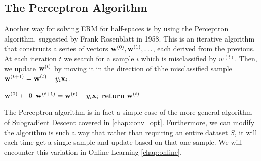 
\subsection{The Perceptron Algorithm}
Another way for solving ERM for half-spaces is by using the Perceptron algorithm, suggested by Frank Rosenblatt in 1958. This is an iterative algorithm that constructs a series of vectors $\mathbf{w}^{\left(0\right)},\mathbf{w}^{\left(1\right)},\ldots$, each derived from the previous. At each iteration $t$ we search for a sample $i$ which is misclassified by $w^{\left(t\right)}$. Then, we update $\mathbf{w}^{\left(t\right)}$ by moving it in the direction of thhe misclassified sample $\mathbf{w}^{\left(t+1\right)}=\mathbf{w}^{\left(t\right)} + y_i\mathbf{x}_i$. 
\begin{algorithm}
	\caption{Batch-Perceptron}\label{batch_perceptron}
	\begin{algorithmic}
		\State $\mathbf{w}^{\left(0\right)} \gets 0$ 
		\State $\mathbf{w}^{\left(t+1\right)}=\mathbf{w}^{\left(t\right)}+y_i\mathbf{x}_i$
		\Else
		\State \textbf{return} $\mathbf{w}^{\left(t\right)}$
		\EndIf
		\EndFor
		\EndProcedure
	\end{algorithmic}
\end{algorithm}



\begin{remark}
The Perceptron algorithm is in fact a simple case of the more general algorithm of Subgradient Descent covered in \autoref{chap:conv_opt}. Furthermore, we can modify the algorithm is such a way that rather than requiring an entire dataset $S$, it will each time get a single sample and update based on that one sample. We will encounter this variation in Online Learning \autoref{chap:online}.
\end{remark}


